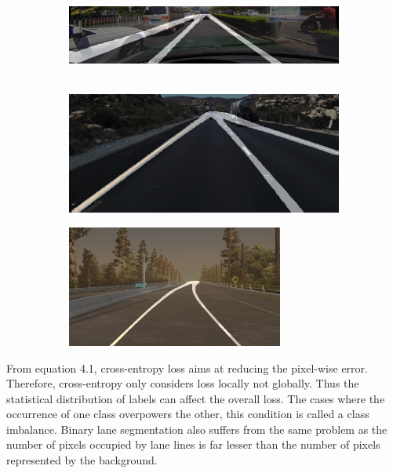        \begin{figure}[h]
       \caption{Initial binary lane segmentation results: (a) SCNN (Res18+CULane), (b) SCNN (Res18 + TuSimple) and (c) RESA (Res18 + sim3d)}
        \centering
        \begin{subfigure}{0.6\textwidth}
        \includegraphics[width=1.2\linewidth, height=3cm]{images/SCNN_res_culane.png} 
        \caption{}
        \label{fig:subim1}
        \end{subfigure}
        \begin{subfigure}{0.4\textwidth}
        \includegraphics[width=1\linewidth, height=4cm]{images/SCNN_res_tusimple.png}
        \caption{}
        \label{fig:subim2}
        \end{subfigure}
        \begin{subfigure}{0.4\textwidth}
        \includegraphics[width=1\linewidth, height=4cm]{images/Resa_r18_sim3d.png}
        \caption{}
        \label{fig:subim2}
        \end{subfigure}
        \label{fig:image2}
        \end{figure}
    
        From equation 4.1, cross-entropy loss aims at reducing the pixel-wise error. Therefore, cross-entropy only considers loss locally not globally. Thus the statistical distribution of labels can affect the overall loss. The cases where the occurrence of one class overpowers the other, this condition is called a class imbalance. Binary lane segmentation also suffers from the same problem as the number of pixels occupied by lane lines is far lesser than the number of pixels represented by the background. 
    
